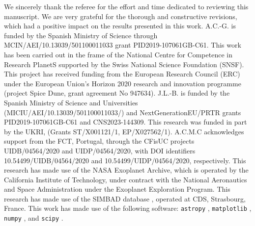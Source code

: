\documentclass[]{aa}
\begin{document}
\begin{acknowledgements}
We sincerely thank the referee for the effort and time dedicated to reviewing this manuscript. We are very grateful for the thorough and constructive revisions, which had a positive impact on the results presented in this work. 
A.C.-G. is funded by the Spanish Ministry of Science through MCIN/AEI/10.13039/501100011033 grant PID2019-107061GB-C61. 
This work has been carried out in the frame of the National Centre for Competence in Research PlanetS supported by the Swiss National Science Foundation (SNSF). This project has received funding from the European Research Council (ERC) under the European Union's Horizon 2020 research and innovation programme (project {\sc Spice Dune}, grant agreement No 947634). 
J.L.-B. is funded by the Spanish Ministry of Science and Universities (MICIU/AEI/10.13039/501100011033/) and NextGenerationEU/PRTR grants PID2019-107061GB-C61 and CNS2023-144309. 
This research was funded in part by the UKRI, (Grants ST/X001121/1, EP/X027562/1).
A.C.M.C acknowledges support from the FCT, Portugal, through the CFisUC projects UIDB/04564/2020 and UIDP/04564/2020, with DOI identifiers 10.54499/UIDB/04564/2020 and 10.54499/UIDP/04564/2020, respectively.
This research has made use of the NASA Exoplanet Archive, which is operated by the California Institute of Technology, under contract with the National Aeronautics and Space Administration under the Exoplanet Exploration Program. 
This research has made use of the SIMBAD database \citep{2000A&AS..143....9W}, operated at CDS, Strasbourg, France.
This work has made use of the following software: \texttt{astropy} \citep{2022ApJ...935..167A}, \texttt{matplotlib} \citep{2007CSE.....9...90H}, \texttt{numpy} \citep{2020Natur.585..357H}, and \texttt{scipy} \citep{2020NatMe..17..261V}.


\end{acknowledgements}

%
%
\end{document}
